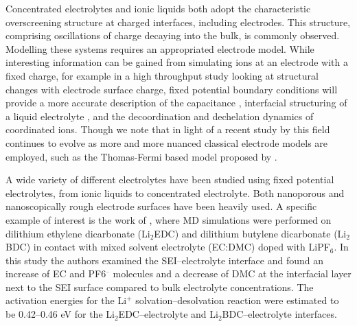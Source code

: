 \documentclass[../main.tex]{subfiles}
\begin{document}
Concentrated electrolytes and ionic liquids both adopt the characteristic overscreening structure at charged interfaces, including electrodes. This structure, comprising oscillations of charge decaying into the bulk, is commonly observed\cite{coles_nanostructure_2017, merlet_simulating_2013}. Modelling these systems requires an appropriated electrode model. While interesting information can be gained from simulating ions at an electrode with a fixed charge, for example in a high throughput study looking at structural changes with electrode surface charge\cite{coles_nanostructure_2017}, fixed potential boundary conditions will provide a more accurate description of the capacitance \cite{merlet_simulating_2013, scalfi_semiclassical_2020}, interfacial structuring of a liquid electrolyte \cite{coles_simulation_2019, vatamanu_ramifications_2017, li_capacitive_2018}, and the decoordination and dechelation dynamics of coordinated ions\cite{vatamanu_molecular_2009}. Though we note that in light of a recent study by \citeauthor{scalfi_semiclassical_2020} this field continues to evolve as more and more nuanced classical electrode models are employed, such as the Thomas-Fermi based model proposed by \citeauthor{scalfi_semiclassical_2020}. \cite{scalfi_semiclassical_2020}

A wide variety of different electrolytes have been studied using fixed potential electrolytes, from ionic liquids to concentrated electrolyte. Both nanoporous \cite{merlet_highly_2013, merlet_molecular_2012, vatamanu_molecular_2009, vatamanu_ramifications_2017} and nanoscopically rough electrode surfaces have been heavily used\cite{vatamanu_influence_2011}. A specific example of interest is the work of \citeauthor{borodin_interfacial_2014}, where MD simulations were performed on dilithium ethylene dicarbonate (Li$_2$EDC) and dilithium butylene dicarbonate (Li$_2$BDC) in contact with mixed solvent electrolyte (EC:DMC) doped with LiPF$_6$. \cite{borodin_interfacial_2014} In this study the authors examined the SEI–electrolyte interface and found an increase of EC and PF6$^{–}$ molecules and a decrease of DMC at the interfacial layer next to the SEI surface compared to bulk electrolyte concentrations. The activation energies for the Li$^{+}$ solvation–desolvation reaction were estimated to be 0.42--0.46 eV for the Li$_2$EDC–electrolyte and Li$_2$BDC–electrolyte interfaces.
    
\end{document}
